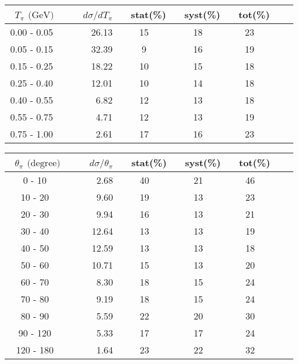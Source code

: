 \documentclass[aps, prd, reprint,showpacs,  preprintnumbers,amsmath,amssymb,superscriptaddress, nofootinbib]{revtex4-1}
\makeatletter
\renewenvironment{table}
  {\def\@captype{table}}
  {}
\makeatother
\begin{document}
\begin{table}
\centering
\begin{tabular}{crccccc}
\hline
~$T_\pi$ $\text{(GeV)}$ &~~~ $d\sigma/dT_\pi$ &~ stat(\%) &~ syst(\%) &~ tot(\%)  \\
\hline
 0.00 -  0.05 &  26.13 & 15 & 18 & 23 \\ 
 0.05 -  0.15 &  32.39 & 9  & 16 & 19 \\ 
 0.15 -  0.25 &  18.22 & 10 & 15 & 18 \\ 
 0.25 -  0.40 &  12.01 & 10 & 14 & 18 \\ 
 0.40 -  0.55 &   6.82 & 12 & 13 & 18 \\ 
 0.55 -  0.75 &   4.71 & 12 & 13 & 19 \\ 
 0.75 -  1.00 &   2.61 & 17 & 16 & 23 \\ 
\hline
\hline
\end{tabular}
\caption{ Flux-averaged differential cross section in $T_\pi$, 
$d\sigma/dT_{\pi} (10^{-40}\text{cm}^2/\text{nucleon}/\text{GeV})$, 
for 1$\pi^0$ production with statistical, systematic, and total uncertainties.}
\label{tb:pi0_kinetic}
\end{table}
\vskip 2pt


\begin{table}
\centering
\begin{tabular}{crccccc}
\hline
~$\theta_\pi$ $\text{(degree)}$ &~~~ $d\sigma/\theta_\pi$ &~ stat(\%) &~ syst(\%) &~ tot(\%)  \\
\hline
 0 - 10 &   2.68   & 40 & 21 & 46 \\ 
10 - 20 &   9.60   & 19 & 13 & 23 \\ 
20 - 30 &   9.94   & 16 & 13 & 21 \\ 
30 - 40 &  12.64   & 13 & 13 & 19 \\ 
40 - 50 &  12.59   & 13 & 13 & 18 \\ 
50 - 60 &  10.71   & 15 & 13 & 20 \\ 
60 - 70 &   8.30   & 18 & 15 & 24 \\ 
70 - 80 &   9.19   & 18 & 15 & 24 \\ 
80 - 90 &   5.59   & 22 & 20 & 30 \\ 
90 - 120 &  5.33   & 17 & 17 & 24 \\ 
120 - 180 & 1.64   & 23 & 22 & 32 \\ 
\hline\hline
\end{tabular}
\caption{ Flux-averaged differential cross section in $\theta_\pi$, 
$d\sigma/d\theta_{\pi} (10^{-42}\text{cm}^2/\text{nucleon}/\text{degree})$, 
for 1$\pi^0$ production with statistical, systematic, and total uncertainties.}
\label{tb:pi0_theta}
\end{table}
\end{document}
